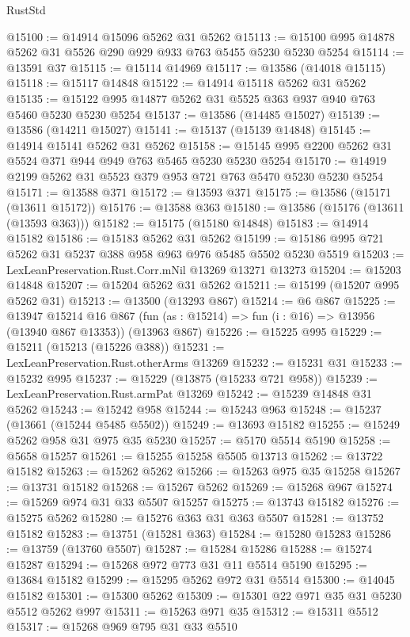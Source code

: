 \begin{lexlean}{RustStd}
\begin{coremodule}
@15100 := @14914 @15096 @5262 @31 @5262
@15113 := @15100 @995 @14878 @5262 @31 @5526 @290 @929 @933 @763 @5455 @5230 @5230 @5254
@15114 := @13591 @37
@15115 := @15114 @14969
@15117 := @13586 (@14018 @15115)
@15118 := @15117 @14848
@15122 := @14914 @15118 @5262 @31 @5262
@15135 := @15122 @995 @14877 @5262 @31 @5525 @363 @937 @940 @763 @5460 @5230 @5230 @5254
@15137 := @13586 (@14485 @15027)
@15139 := @13586 (@14211 @15027)
@15141 := @15137 (@15139 @14848)
@15145 := @14914 @15141 @5262 @31 @5262
@15158 := @15145 @995 @2200 @5262 @31 @5524 @371 @944 @949 @763 @5465 @5230 @5230 @5254
@15170 := @14919 @2199 @5262 @31 @5523 @379 @953 @721 @763 @5470 @5230 @5230 @5254
@15171 := @13588 @371
@15172 := @13593 @371
@15175 := @13586 (@15171 (@13611 @15172))
@15176 := @13588 @363
@15180 := @13586 (@15176 (@13611 (@13593 @363)))
@15182 := @15175 (@15180 @14848)
@15183 := @14914 @15182
@15186 := @15183 @5262 @31 @5262
@15199 := @15186 @995 @721 @5262 @31 @5237 @388 @958 @963 @976 @5485 @5502 @5230 @5519
@15203 := LexLeanPreservation.Rust.Corr.mNil @13269 @13271 @13273
@15204 := @15203 @14848
@15207 := @15204 @5262 @31 @5262
@15211 := @15199 (@15207 @995 @5262 @31)
@15213 := @13500 (@13293 @867)
@15214 := @6 @867
@15225 := @13947
    @15214
    @16
    @867
    (fun (as : @15214) => fun (i : @16) => @13956 (@13940 @867 @13353))
    (@13963 @867)
@15226 := @15225 @995
@15229 := @15211 (@15213 (@15226 @388))
@15231 := LexLeanPreservation.Rust.otherArms @13269
@15232 := @15231 @31
@15233 := @15232 @995
@15237 := @15229 (@13875 (@15233 @721 @958))
@15239 := LexLeanPreservation.Rust.armPat @13269
@15242 := @15239 @14848 @31 @5262
@15243 := @15242 @958
@15244 := @15243 @963
@15248 := @15237 (@13661 (@15244 @5485 @5502))
@15249 := @13693 @15182
@15255 := @15249 @5262 @958 @31 @975 @35 @5230
@15257 := @5170 @5514 @5190
@15258 := @5658 @15257
@15261 := @15255 @15258 @5505 @13713
@15262 := @13722 @15182
@15263 := @15262 @5262
@15266 := @15263 @975 @35 @15258
@15267 := @13731 @15182
@15268 := @15267 @5262
@15269 := @15268 @967
@15274 := @15269 @974 @31 @33 @5507 @15257
@15275 := @13743 @15182
@15276 := @15275 @5262
@15280 := @15276 @363 @31 @363 @5507
@15281 := @13752 @15182
@15283 := @13751 (@15281 @363)
@15284 := @15280 @15283
@15286 := @13759 (@13760 @5507)
@15287 := @15284 @15286
@15288 := @15274 @15287
@15294 := @15268 @972 @773 @31 @11 @5514 @5190
@15295 := @13684 @15182
@15299 := @15295 @5262 @972 @31 @5514
@15300 := @14045 @15182
@15301 := @15300 @5262
@15309 := @15301 @22 @971 @35 @31 @5230 @5512 @5262 @997
@15311 := @15263 @971 @35
@15312 := @15311 @5512
@15317 := @15268 @969 @795 @31 @33 @5510

\end{coremodule}
\end{lexlean}
